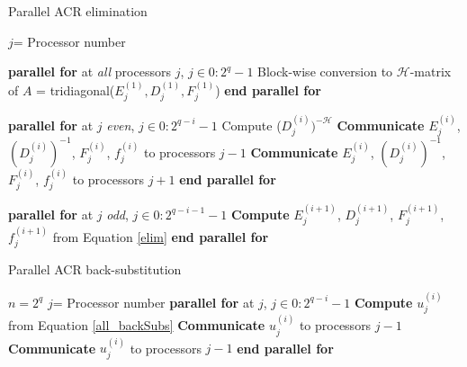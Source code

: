 \documentclass[]{elsarticle}
\begin{document}
\begin{algorithm}[H]
\caption{Parallel ACR elimination}
\begin{algorithmic}[1]
\STATE $j$= Processor number

\STATE \textbf{parallel for} at \textit{all} processors $j$, $j \in 0:2^{q}-1$
\STATE \hspace{\algorithmicindent} Block-wise conversion to $\mathcal{H}$-matrix of $A$ = \mbox{tridiagonal}($E_{j}^{(1)},D_{j}^{(1)},F_{j}^{(1)}$)
\STATE \textbf{end parallel for}


\STATE \textbf{parallel for} at $j$ \textit{even}, $j \in 0:2^{q-i}-1$
\STATE \hspace{\algorithmicindent} Compute ($D_{j}^{(i)})^{-\mathcal{H}}$
\STATE \hspace{\algorithmicindent} \textbf{Communicate} $E_{j}^{(i)}$, $(D_{j}^{(i)})^{-1}$, $F_{j}^{(i)}$, $f_{j}^{(i)}$ to processors $j-1$ 
\STATE \hspace{\algorithmicindent} \textbf{Communicate} $E_{j}^{(i)}$, $(D_{j}^{(i)})^{-1}$, $F_{j}^{(i)}$, $f_{j}^{(i)}$ to processors $j+1$
\STATE \textbf{end parallel for}

\STATE \textbf{parallel for} at $j$ \textit{odd}, $j \in 0:2^{q-i-1}-1$
\STATE \hspace{\algorithmicindent}  \textbf{Compute} $E_{j}^{(i+1)}$, $D_{j}^{(i+1)}$, $F_{j}^{(i+1)}$, $f_{j}^{(i+1)}$ from Equation \ref{elim}
\STATE \textbf{end parallel for}

\ENDFOR
\end{algorithmic}
\label{ParalllelACRElimination}
\end{algorithm}

\begin{algorithm}[H]
\caption{Parallel ACR back-substitution}
\begin{algorithmic}[1]
\STATE $n=2^q$
\STATE $j$= Processor number
\STATE \textbf{parallel for} at $j$, $j \in 0:2^{q-i}-1$
\STATE \hspace{\algorithmicindent} \textbf{Compute} $u_{j}^{(i)}$ from Equation \ref{all_backSubs}
\STATE \hspace{\algorithmicindent} \textbf{Communicate} $u_{j}^{(i)}$ to processors $j-1$ 
\STATE \hspace{\algorithmicindent} \textbf{Communicate} $u_{j}^{(i)}$ to processors $j-1$ 
\STATE \textbf{end parallel for}
\ENDFOR
\end{algorithmic}
\label{ParalllelACRBacksubstitution}
\end{algorithm}
\end{document}
